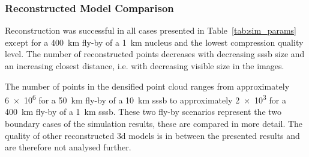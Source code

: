 \subsubsection{Reconstructed Model Comparison}
Reconstruction was successful in all cases presented in Table~\ref{tab:sim_params} except for a \SI{400}{\kilo\meter} fly-by of a \SI{1}{\kilo\meter} nucleus and the lowest compression quality level. The number of reconstructed points decreases with decreasing \gls{sssb} size and an increasing closest distance, i.e. with decreasing visible size in the images.

The number of points in the densified point cloud ranges from approximately \SI{6e6}{} for a \SI{50}{\kilo\meter} fly-by of a \SI{10}{\kilo\meter} \gls{sssb} to approximately \SI{2e3}{} for a \SI{400}{\kilo\meter} fly-by of a \SI{1}{\kilo\meter} \gls{sssb}. These two fly-by scenarios represent the two boundary cases of the simulation results, these are compared in more detail. The quality of other reconstructed \gls{3d} models is in between the presented results and are therefore not analysed further.

